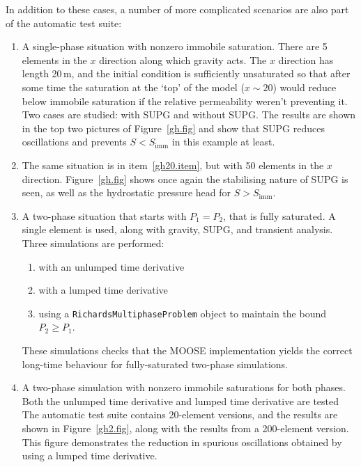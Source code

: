 \documentclass[]{scrreprt}
\begin{document}
\noindent In addition to these cases, a number of more complicated scenarios are
also part of the automatic test suite:
\begin{enumerate}
\item\label{gh20.item} A single-phase situation with nonzero immobile saturation.
  There are 5 elements in the $x$ direction along which gravity acts.
  The $x$ direction has length 20\,m, and the initial condition is
  sufficiently unsaturated so that after some time the saturation at
  the `top' of the model ($x\sim 20$) would reduce below immobile
  saturation if the relative permeability weren't preventing it.  Two
  cases are studied: with SUPG and without SUPG.  The results are
  shown in the top two pictures of Figure~\ref{gh.fig} and show that
  SUPG reduces oscillations and prevents $S<S_{\mathrm{imm}}$ in this
  example at least.
\item The same situation is in item~\ref{gh20.item}, but with 50
  elements in the $x$ direction.  Figure~\ref{gh.fig} shows once again
  the stabilising nature of SUPG is seen, as well as the hydrostatic
  pressure head for $S>S_{\mathrm{imm}}$.
\item A two-phase situation that starts with $P_{1}=P_{2}$, that is
  fully saturated.  A single element is used, along with gravity,
  SUPG, and transient analysis.  Three simulations are performed:
\begin{enumerate}
\item with an unlumped time derivative
\item with a lumped time derivative
\item using a {\tt RichardsMultiphaseProblem} object to maintain the
  bound $P_{2}\geq P_{1}$.
\end{enumerate}
These simulations checks that the MOOSE
  implementation yields the correct long-time behaviour for
  fully-saturated two-phase simulations.
\item A two-phase simulation with nonzero immobile saturations for
  both phases.  Both the unlumped time derivative and lumped time
  derivative are tested The automatic test suite contains 20-element
  versions, and the results are shown in Figure~\ref{gh2.fig}, along
  with the results from a 200-element version.  This figure
  demonstrates the reduction in spurious oscillations obtained by
  using a lumped time derivative.
\end{enumerate}
\end{document}
